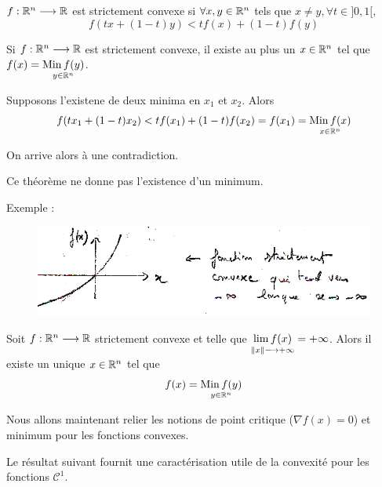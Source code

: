 \begin{fdef}
    $f : \mathbb{R}^n \longrightarrow \mathbb{R}$ est strictement convexe si $\forall x,y \in \mathbb{R}^n$ tels
que $x \ne y, \forall t \in ]0,1[,$
    \[
        f(tx + (1-t)y) < tf(x) + (1-t) f(y)
    \]
\end{fdef}

\begin{ftheo}
    Si $f : \mathbb{R}^n \longrightarrow \mathbb{R}$ est strictement convexe, il existe au plus un
    $x \in \mathbb{R}^n$ tel que $f(x) = \underset{y\in \mathbb{R}^n}{\operatorname{Min} f(y)}$.
\end{ftheo}

\begin{preuve}
    Supposons l'existene de deux minima en $x_1$ et $x_2$. Alors 
    \[
        f(tx_1 + (1-t)x_2) < tf(x_1) + (1-t) f(x_2) = f(x_1) = \underset{x \in \mathbb{R}^n}{\operatorname{Min} f(x)}
    \]

    On arrive alors à une contradiction.
\end{preuve}

\begin{remark}
    Ce théorème ne donne pas l'existence d'un minimum.

    Exemple :
\begin{figure}[h]
    \centering
    \includegraphics[scale=0.7]{7optim-min-str-cvx.png}
    \label{fig:7optim-min-str-cvx}
\end{figure}
\end{remark}

\begin{ftheo}
    Soit $f : \mathbb{R}^n \longrightarrow \mathbb{R}$ strictement convexe et telle que $\underset{\left\lVert x\right\rVert \longrightarrow +\infty}{\lim f(x)} = +\infty$. Alors il existe un unique $x \in \mathbb{R}^n$ tel que
    \[
        f(x) = \underset{y \in \mathbb{R}^n}{\operatorname{Min} f(y)}
    \]
\end{ftheo}

Nous allons maintenant relier les notions de point critique ($\nabla f(x) = 0$) et minimum
pour les fonctions convexes.

Le résultat suivant fournit une caractérisation utile de la convexité pour les fonctions
$\mathcal{C}^1$.

